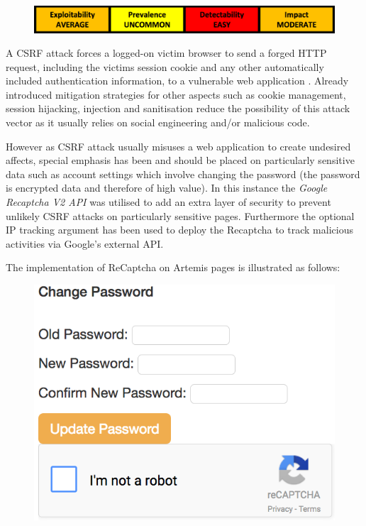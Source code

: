     \begin{figure}[h]
    	\centering
    	\includegraphics[scale=0.5,center]{chapters/chapter03/figures/csrfClass.png}
    	\label{CSRF}
    \end{figure}
    

    
    
    A CSRF attack forces a logged-on victim browser to send a forged HTTP request, including the victim\textquotesingle s session cookie and any other automatically included authentication information, to a vulnerable web application \cite{OWASP2017}. Already introduced mitigation strategies for other aspects such as cookie management, session hijacking, injection and sanitisation reduce the possibility of this attack vector as it usually relies on social engineering and/or malicious code.
    
    However as CSRF attack usually misuses a web application to create undesired affects, special emphasis has been  and should be \cite{OWASPa} placed on particularly sensitive data such as account settings which involve changing the password (the password is encrypted data and therefore of high value). In this instance the \textit{Google Recaptcha V2 API} was utilised to add an extra layer of security to prevent unlikely CSRF attacks on particularly sensitive pages. Furthermore the optional IP tracking argument has been used to deploy the Recaptcha to track malicious activities via Google's external API.
    
    The implementation  of ReCaptcha on Artemis pages is illustrated as follows:
  
    \begin{figure}[h]
    	\centering
    	\includegraphics[scale=0.44,center]{chapters/chapter03/figures/captchaGoogle.png}
    	\label{googleRecaptcha}
    \end{figure}  
    
